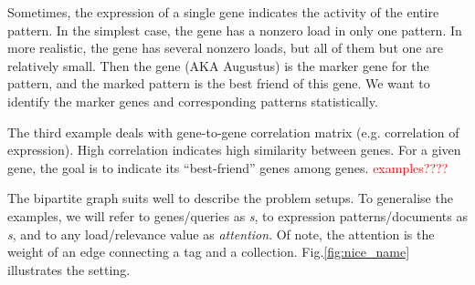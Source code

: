 \documentclass{llncs}
\begin{document}
Sometimes, the expression of a single gene indicates the activity of the entire pattern. In the simplest case, the gene has a nonzero load in only one pattern. In more realistic, the gene has several nonzero loads, but all of them but one are relatively small. Then the gene (AKA Augustus) is the marker gene \cite{patternmarkers:2017} for the pattern, and the marked pattern is the best friend of this gene. We want to identify the marker genes and corresponding patterns statistically.  


The third example deals with gene-to-gene correlation matrix (e.g. correlation of expression). High correlation indicates high similarity between genes. For a given gene, the goal is to indicate its ``best-friend'' genes among genes. \textcolor{red}{examples????}
















The bipartite graph suits well to describe the problem setups. To generalise the examples, we will refer to genes/queries as \textit{{\tag}s}, to expression patterns/documents as \textit{{\collection}s}, and to any load/relevance value as \textit{attention}. Of note, the attention is the weight of an edge connecting a tag and a collection. Fig.\ref{fig:nice_name} illustrates the setting.
\end{document}
